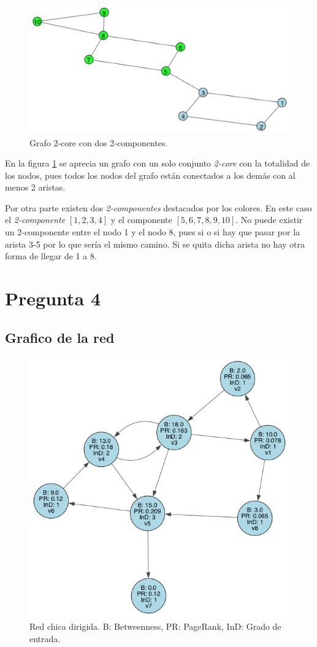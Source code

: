 \documentclass[letterpaper]{article}
\begin{document}
\begin{figure}[H]
  \centering
  \includegraphics[width=.6\linewidth]{img/p3.png}
  \caption{ Grafo 2-core con dos 2-componentes.}
  \label{red:3}
\end{figure}

En la figura \ref{red:3} se aprecia un grafo con un solo conjunto \textit{2-core} con la totalidad de los nodos, pues todos los nodos del grafo están conectados a los demás con al menos 2 aristas.

Por otra parte existen dos \textit{2-componentes} destacados por los colores. En este caso el \textit{2-componente} $\left[1,2,3,4\right]$ y el componente $\left[5,6,7,8,9,10\right]$. No puede existir un 2-componente entre el nodo 1 y el nodo 8, pues si o si hay que pasar por la arista 3-5 por lo que sería el mismo camino. Si se quita dicha arista no hay otra forma de llegar de 1 a 8.


\section{Pregunta 4}

\subsection{Grafico de la red}
\begin{figure}[H]
  \centering
  \includegraphics[width=.5\linewidth]{img/p4-all.png}
  \caption{Red chica dirigida. B: Betweenness, PR: PageRank, InD: Grado de entrada.}
  \label{red:4}
\end{figure}
\end{document}

